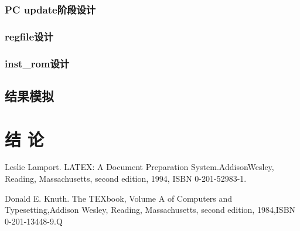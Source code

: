 \documentclass[a4paper,12pt]{report}
\begin{document}
\begin{spacing}{1.5}
\subsection{PC update阶段设计}
	
\subsection{regfile设计}
	
\subsection{inst\_rom设计}
	
	
\section{结果模拟}
	
\end{spacing}

\chapter *{结 {\quad} 论}
\begin{spacing}{1.5}
	
\end{spacing}


\begin{thebibliography}{99}
\songti {} 	
	Leslie Lamport. LATEX: A Document Preparation System.AddisonWesley, Reading, Massachusetts, second edition, 1994, ISBN 0-201-52983-1.
	
	Donald E. Knuth. The TEXbook, Volume A of Computers and Typesetting,Addison Wesley, Reading, Massachusetts, second edition, 1984,ISBN 0-201-13448-9.Q

	
\end{thebibliography}
\end{document}
